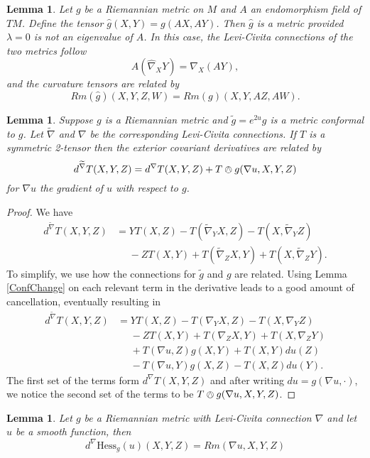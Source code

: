 \documentclass{amsart}
\newtheorem{lem}[thm]{Lemma}
\begin{document}
\begin{lem}
\label{TensorChange}
Let $g$ be a Riemannian metric on $M$ and $A$ an endomorphism field of $TM$.
Define the tensor $\hat{g}(X,Y) = g(AX,AY)$.
Then $\hat{g}$ is a metric provided $\lambda = 0$ is not an eigenvalue of $A$. 
In this case, the Levi-Civita connections of the two metrics follow
\[
A (\widehat{\nabla}_XY) = \nabla_X(AY),
\]
and the curvature tensors are related by 
\[
Rm(\hat{g})(X,Y,Z,W) = Rm(g)(X,Y,AZ,AW).
\]
\end{lem}


\begin{lem}
\label{dRel}
Suppose $g$ is a Riemannian metric and $\tilde{g} = e^{2u}g$ is a metric conformal to $g$. Let $\widetilde{\nabla}$ and $\nabla$ be the corresponding Levi-Civita connections. 
If $T$ is a symmetric 2-tensor then the exterior covariant derivatives are related by 
\[
d^{\widetilde{\nabla}} T(X,Y,Z) = d^\nabla T(X,Y,Z) + T \owedge g (\nabla u ,X,Y,Z)
\]
for $\nabla u$ the gradient of $u$ with respect to $g$.
\end{lem}
\begin{proof}
We have
\begin{align*}
d^{\widetilde{\nabla}}T(X,Y,Z)
&= YT(X,Z) - T(\widetilde{\nabla}_YX,Z) - T(X, \widetilde{\nabla}_YZ) \\
&\phantom{=} - ZT(X,Y) + T(\widetilde{\nabla}_ZX,Y) + T(X,\widetilde{\nabla}_ZY).
\end{align*}
To simplify, we use how the connections for $\tilde{g}$ and $g$ are related.
Using Lemma \ref{ConfChange} on each relevant term in the derivative leads to a good amount of cancellation, eventually resulting in 
\begin{align*}
d^{\widetilde{\nabla}}T(X,Y,Z)
&=YT(X,Z) - T(\nabla_YX,Z) - T(X, \nabla_YZ) \\
&\phantom{=} - ZT(X,Y) + T(\nabla_ZX,Y) + T(X,\nabla_ZY) \\
&\phantom{=} + T(\nabla u ,Z)g(X,Y) + T(X,Y)du(Z) \\
&\phantom{=} - T(\nabla u, Y)g(X,Z) - T(X,Z)du(Y).
\end{align*}
The first set of the terms form $d^\nabla T(X,Y,Z)$ and after writing $du = g(\nabla u , \cdot)$, we notice the second set of the terms to be $T\owedge g(\nabla u ,X,Y,Z)$.
\end{proof}

\begin{lem}
\label{Hess}
Let $g$ be a Riemannian metric with Levi-Civita connection $\nabla$ and let $u$ be a smooth function, then
\[
d^\nabla \mathrm{Hess}_g(u) (X,Y,Z) = Rm(\nabla u, X, Y, Z)
\]
\end{lem}
\end{document}
